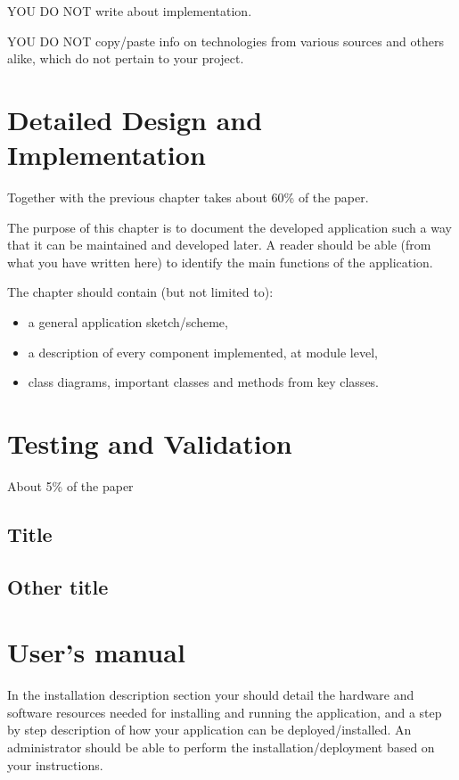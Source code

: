 \documentclass[12pt,a4paper,twoside]{report}
\begin{document}
{\color{red} YOU DO NOT write about implementation.

YOU DO NOT copy/paste info on technologies from various sources and others alike, which do not pertain to your project.
}

\chapter{Detailed Design and Implementation}

Together with the previous chapter takes about 60\% of the paper.

The purpose of this chapter is to document the developed application such a way that it can be maintained and developed later. A reader should be able (from what you have written here) to identify the main functions of the application.

The chapter should contain (but not limited to):
\begin{itemize}
 \item a general application sketch/scheme,
\item a description of every component implemented, at module level,
\item class diagrams, important classes and methods from key classes.
\end{itemize}

\chapter{Testing and Validation}

About 5\% of the paper
\section{Title}
\section{Other title}

\chapter{User's manual}

In the installation description section your should detail the hardware and software resources needed for installing and running the application, and a step by step description of how your application can be deployed/installed. An administrator should be able to perform the installation/deployment based on your instructions.
\end{document}
